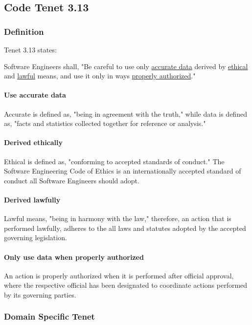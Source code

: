 \documentclass[12pt]{article}
\begin{document}
\begin{multicols}{2}
\subsection{Code Tenet 3.13}

\subsubsection{Definition}

Tenet 3.13  states:
\begin{framed}
Software Engineers shall, "Be careful to use only \ul{accurate data} derived by \ul{ethical} and \ul{lawful} means, and use it only in ways \ul{properly authorized}."\cite{softwareEngineeringCodeOfEthics}
\end{framed}

\paragraph{Use accurate data}
Accurate is defined as, "being in agreement with the truth," while data is defined as, "facts and statistics collected together for reference or analysis."\cite{cambridgeDictionary}

\paragraph{Derived ethically}
Ethical is defined as, "conforming to accepted standards of conduct."\cite{cambridgeDictionary} The Software Engineering Code of Ethics is an internationally accepted standard of conduct all Software Engineers should adopt.

\paragraph{Derived lawfully}
Lawful means, "being in harmony with the law," therefore, an action that is performed lawfully, adheres to the all laws and statutes adopted by the accepted governing legislation.\cite{cambridgeDictionary}

\paragraph{Only use data when properly authorized}
An action is properly authorized when it is performed after official approval, where the respective official has been designated to coordinate actions performed by its governing parties.

\subsubsection{Domain Specific Tenet}


\end{multicols}
\end{document}
